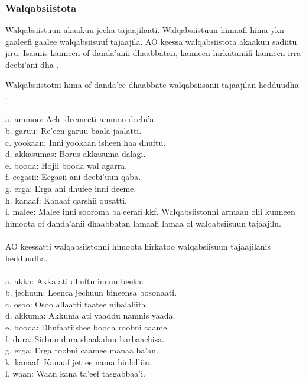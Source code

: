 \documentclass[11pt,b5paper]{book}
\begin{document}
\subsubsection{Walqabsiistota}

Walqabsiistuun akaakuu jecha tajaajilaati. Walqabsiistuun himaafi hima ykn gaaleefi gaalee walqabsiisuuf tajaajila. AO keessa walqabsiistota akaakuu sadiitu jiru. Isaanis kanneen of danda’anii dhaabbatan, kanneen hirkataniifi kanneen irra deebi’ani dha \cite[p.55]{griefenow2001grammatical}. 

Walqabsiistotni hima of danda’ee dhaabbate walqabsiisanii tajaajilan hedduudha \cite[p.56]{griefenow2001grammatical}.\\
\\
a. ammoo:  Achi deemeeti ammoo deebi’a.\\
b. garuu:  Re’een garuu baala jaalatti.\\
c. yookaan: Inni yookaan isheen haa dhuftu.\\
d. akkasumas: Borus akkasuma dalagi.\\
e. booda:  Hojii booda wal agarra.\\
f. eegasii: Eegasii ani deebi’uun qaba.\\
g. erga: Erga ani dhufee inni deeme.\\
h. kanaaf: Kanaaf qarshii qusatti.\\
i. malee: Malee inni sooroma ba’eerafi kkf. Walqabsiistonni armaan olii kunneen himoota of danda’anii
dhaabbatan lamaafi lamaa ol walqabsiisuun tajaajilu. \\
\\
AO keessatti walqabsiistonni himoota hirkatoo walqabsiisuun tajaajilanis hedduudha.\\
\\
a. akka: Akka ati dhuftu innuu beeka.\\
b. jechuun: Leenca jechuun bineensa bosonaati.\\
c. osoo: Osoo allaatti taatee nibalaliita.\\
d. akkuma: Akkuma ati yaaddu namnis yaada.\\
e. booda: Dhufaatiishee booda roobni caame.\\
f. dura: Sirbuu dura shaakaluu barbaachisa.\\
g. erga: Erga roobni caamee manaa ba’an.\\
k. kanaaf: Kanaaf jettee nama hinlolliin.\\
l. waan: Waan kana ta’eef tasgabbaa’i.\\
\end{document}
